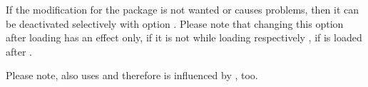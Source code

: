 If the modification for the package is not wanted or causes problems,
then it can be deactivated selectively with option
.
Please note that changing this option after loading
 has an effect only, if it is not  while
loading  respectively , if
 is loaded after .

Please note,
 also uses
 and therefore is influenced by , too.%
%

\endinput

